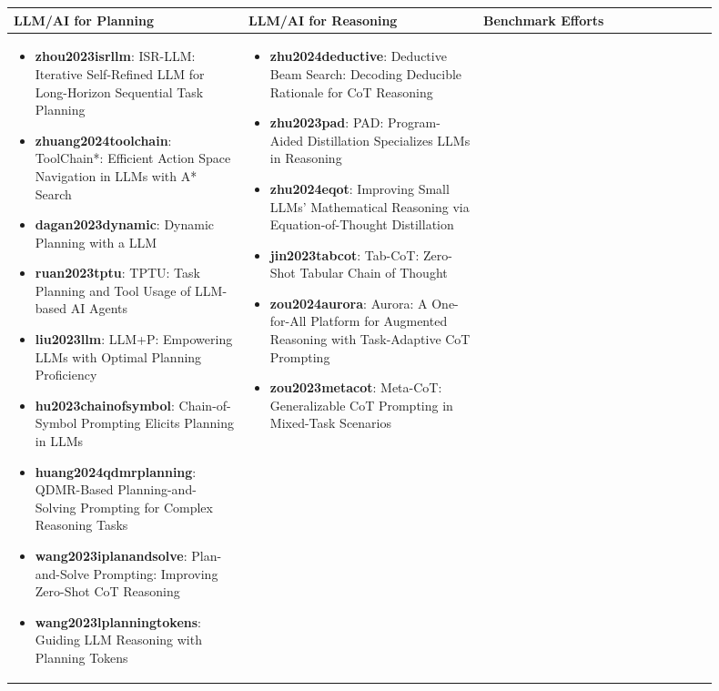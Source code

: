 \begin{table}[htbp]
\centering
\small
\begin{tabular}{|p{0.3\linewidth}|p{0.3\linewidth}|p{0.3\linewidth}|}
\hline
\textbf{LLM/AI for Planning} & \textbf{LLM/AI for Reasoning} & \textbf{Benchmark Efforts} \\
\hline
\begin{itemize}[leftmargin=*]
    \item \textbf{zhou2023isrllm}: ISR-LLM: Iterative Self-Refined LLM for Long-Horizon Sequential Task Planning
    \item \textbf{zhuang2024toolchain}: ToolChain*: Efficient Action Space Navigation in LLMs with A* Search
    \item \textbf{dagan2023dynamic}: Dynamic Planning with a LLM
    \item \textbf{ruan2023tptu}: TPTU: Task Planning and Tool Usage of LLM-based AI Agents
    \item \textbf{liu2023llm}: LLM+P: Empowering LLMs with Optimal Planning Proficiency
    \item \textbf{hu2023chainofsymbol}: Chain-of-Symbol Prompting Elicits Planning in LLMs
    \item \textbf{huang2024qdmrplanning}: QDMR-Based Planning-and-Solving Prompting for Complex Reasoning Tasks
    \item \textbf{wang2023iplanandsolve}: Plan-and-Solve Prompting: Improving Zero-Shot CoT Reasoning
    \item \textbf{wang2023lplanningtokens}: Guiding LLM Reasoning with Planning Tokens
\end{itemize} 
&
\begin{itemize}[leftmargin=*]
    \item \textbf{zhu2024deductive}: Deductive Beam Search: Decoding Deducible Rationale for CoT Reasoning
    \item \textbf{zhu2023pad}: PAD: Program-Aided Distillation Specializes LLMs in Reasoning
    \item \textbf{zhu2024eqot}: Improving Small LLMs' Mathematical Reasoning via Equation-of-Thought Distillation
    \item \textbf{jin2023tabcot}: Tab-CoT: Zero-Shot Tabular Chain of Thought
    \item \textbf{zou2024aurora}: Aurora: A One-for-All Platform for Augmented Reasoning with Task-Adaptive CoT Prompting
    \item \textbf{zou2023metacot}: Meta-CoT: Generalizable CoT Prompting in Mixed-Task Scenarios

\end{itemize}
\end{tabular}
\end{table}
